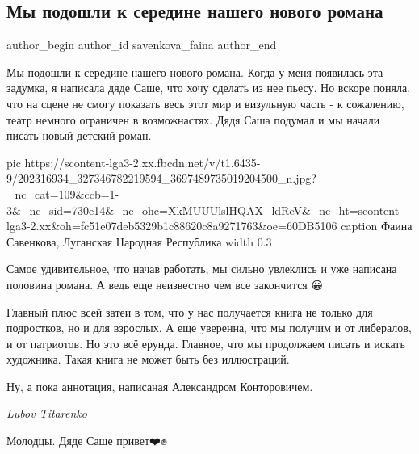  
 
 
 
 
 
\subsection{Мы подошли к середине нашего нового романа}
\label{sec:25_06_2021.fb.savenkova_faina.1.novyj_roman_seredina_djadja_sasha}
\ifcmt
 author_begin
   author_id savenkova_faina
 author_end
\fi

Мы подошли к середине нашего нового романа. Когда у меня появилась эта задумка,
я написала дяде Саше, что хочу сделать из нее пьесу. Но вскоре поняла, что на
сцене не смогу показать весь этот мир и визульную часть - к сожалению, театр
немного ограничен в возможнастях. Дядя Саша подумал и мы начали писать новый
детский роман. 

\ifcmt
  pic https://scontent-lga3-2.xx.fbcdn.net/v/t1.6435-9/202316934_327346782219594_3697489735019204500_n.jpg?_nc_cat=109&ccb=1-3&_nc_sid=730e14&_nc_ohc=XkMUUUlslHQAX_ldReV&_nc_ht=scontent-lga3-2.xx&oh=fc51e07deb5329b1c88620c8a9271763&oe=60DB5106
  caption Фаина Савенкова, Луганская Народная Республика
  width 0.3
\fi

Самое удивительное, что начав работать, мы сильно увлеклись и уже написана
половина романа. А ведь еще неизвестно чем все закончится 😀 \Laughey[2.0][yellow][white]

Главный плюс всей затеи в том, что у нас получается книга не только для
подростков, но и для взрослых. А еще уверенна, что мы получим и от либералов, и
от патриотов. Но это всё ерунда. Главное, что мы продолжаем писать и искать
художника. Такая книга не может быть без иллюстраций.

Ну, а пока аннотация, написаная Александром Конторовичем.

\emph{Lubov Titarenko}

Молодцы. Дяде Саше привет❤️✊🙏

